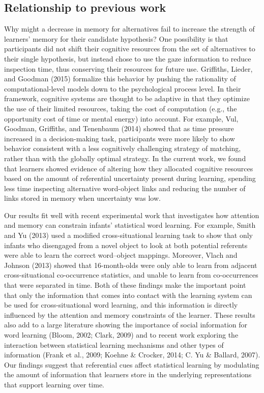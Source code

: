 \documentclass[oneside]{report}
\begin{document}
\hypertarget{relationship-to-previous-work}{%
\subsection{Relationship to previous
work}\label{relationship-to-previous-work}}

Why might a decrease in memory for alternatives fail to increase the
strength of learners' memory for their candidate hypothesis? One
possibility is that participants did not shift their cognitive resources
from the set of alternatives to their single hypothesis, but instead
chose to use the gaze information to reduce inspection time, thus
conserving their resources for future use. Griffiths, Lieder, and
Goodman (2015) formalize this behavior by pushing the rationality of
computational-level models down to the psychological process level. In
their framework, cognitive systems are thought to be adaptive in that
they optimize the use of their limited resources, taking the cost of
computation (e.g., the opportunity cost of time or mental energy) into
account. For example, Vul, Goodman, Griffiths, and Tenenbaum (2014)
showed that as time pressure increased in a decision-making task,
participants were more likely to show behavior consistent with a less
cognitively challenging strategy of matching, rather than with the
globally optimal strategy. In the current work, we found that learners
showed evidence of altering how they allocated cognitive resources based
on the amount of referential uncertainty present during learning,
spending less time inspecting alternative word-object links and reducing
the number of links stored in memory when uncertainty was low.

Our results fit well with recent experimental work that investigates how
attention and memory can constrain infants' statistical word learning.
For example, Smith and Yu (2013) used a modified cross-situational
learning task to show that only infants who disengaged from a novel
object to look at both potential referents were able to learn the
correct word--object mappings. Moreover, Vlach and Johnson (2013) showed
that 16-month-olds were only able to learn from adjacent
cross-situational co-occurrence statistics, and unable to learn from
co-occurrences that were separated in time. Both of these findings make
the important point that only the information that comes into contact
with the learning system can be used for cross-situational word
learning, and this information is directly influenced by the attention
and memory constraints of the learner. These results also add to a large
literature showing the importance of social information for word
learning (Bloom, 2002; Clark, 2009) and to recent work exploring the
interaction between statistical learning mechanisms and other types of
information (Frank et al., 2009; Koehne \& Crocker, 2014; C. Yu \&
Ballard, 2007). Our findings suggest that referential cues affect
statistical learning by modulating the amount of information that
learners store in the underlying representations that support learning
over time.
\end{document}
